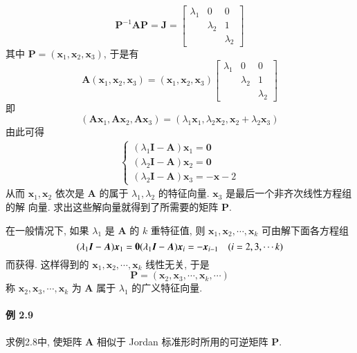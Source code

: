 $$
    \bm{P}^{-1}\bm{AP} = \bm{J} = \begin{bmatrix}
        \lambda_1 & 0         & 0         \\
                  & \lambda_2 & 1         \\
                  &           & \lambda_2
    \end{bmatrix}
$$
其中 $\bm{P} = (\bm{x}_1, \bm{x}_2, \bm{x}_3)$, 于是有
$$
    \bm{A}(\bm{x}_1, \bm{x}_2, \bm{x}_3) = (\bm{x}_1, \bm{x}_2, \bm{x}_3)\begin{bmatrix}
        \lambda_1 & 0         & 0         \\
                  & \lambda_2 & 1         \\
                  &           & \lambda_2
    \end{bmatrix}
$$
即
$$
    (\bm{Ax}_1, \bm{Ax}_2, \bm{Ax}_3) = (\lambda_1\bm{x}_1, \lambda_2\bm{x}_2, \bm{x}_2 + \lambda_2\bm{x}_3)
$$
由此可得
\begin{gather}
    \begin{cases}
        (\lambda_1\bm{I} - \bm{A})\bm{x}_1 = \bm{0} \\
        (\lambda_2\bm{I} - \bm{A})\bm{x}_2 = \bm{0} \\
        (\lambda_2\bm{I} - \bm{A})\bm{x}_3 = -\bm{x}-2
    \end{cases}
    \tag{2.1.10}
\end{gather}
从而 $\bm{x}_1, \bm{x}_2$ 依次是 $\bm{A}$ 的属于 $\lambda_1, \lambda_2$ 的特征向量. $\bm{x}_3$ 是最后一个非齐次线性方程组的解
向量. 求出这些解向量就得到了所需要的矩阵 $\bm{P}$.

\par 在一般情况下, 如果 $\lambda_1$ 是 $\bm{A}$ 的 $k$ 重特征值, 则 $\bm{x}_1, \bm{x}_2, \cdots, \bm{x}_k$ 可由解下面各方程组
$$
    (\lambda_1\bm{I} - \bm{A})\bm{x}_1 = \bm{0} \\
    (\lambda_1\bm{I} - \bm{A})\bm{x}_i = -\bm{x}_{i-1} \quad (i = 2, 3, \cdots k)
$$
而获得. 这样得到的 $\bm{x}_1, \bm{x}_2, \cdots, \bm{x}_k$ 线性无关, 于是
$$
    \bm{P} = (\bm{x}_2, \bm{x}_3, \cdots, \bm{x}_k, \cdots)
$$
称 $\bm{x}_2, \bm{x}_3, \cdots, \bm{x}_k$ 为 $\bm{A}$ 属于 $\lambda_1$ 的广义特征向量.

\paragraph*{例 2.9} 求例2.8中, 使矩阵 $\bm{A}$ 相似于 Jordan 标准形时所用的可逆矩阵 $\bm{P}$.

